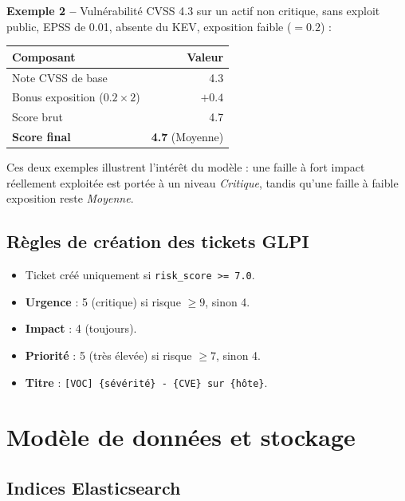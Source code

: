 \documentclass[11pt,a4paper]{article}
\begin{document}
\textbf{Exemple 2 --} Vuln\'erabilit\'e CVSS 4.3 sur un actif non critique,
sans exploit public, EPSS de 0.01, absente du KEV, exposition faible
($= 0.2$) :

\begin{center}
\small
\begin{tabular}{l r}
\toprule
\textbf{Composant} & \textbf{Valeur} \\
\midrule
Note CVSS de base & 4.3 \\
Bonus exposition ($0.2 \times 2$) & $+0.4$ \\
\midrule
Score brut & 4.7 \\
\textbf{Score final} & \textbf{4.7} (Moyenne) \\
\bottomrule
\end{tabular}
\end{center}

Ces deux exemples illustrent l'int\'er\^et du mod\`ele : une faille \`a fort
impact r\'eellement exploit\'ee est port\'ee \`a un niveau \emph{Critique},
tandis qu'une faille \`a faible exposition reste \emph{Moyenne}.

\subsection{R\`egles de cr\'eation des tickets GLPI}

\begin{itemize}[leftmargin=1.6em]
  \item Ticket cr\'e\'e uniquement si \texttt{risk\_score >= 7.0}.
  \item \textbf{Urgence} : 5 (critique) si risque $\geq 9$, sinon 4.
  \item \textbf{Impact} : 4 (toujours).
  \item \textbf{Priorit\'e} : 5 (tr\`es \'elev\'ee) si risque $\geq 7$, sinon 4.
  \item \textbf{Titre} : \texttt{[VOC] \{s\'ev\'erit\'e\} - \{CVE\} sur \{h\^ote\}}.
\end{itemize}

\clearpage

\section{Mod\`ele de donn\'ees et stockage}

\subsection{Indices Elasticsearch}
\end{document}
